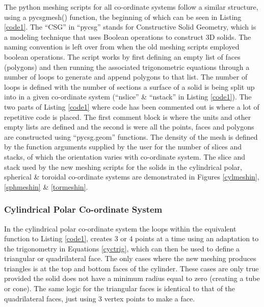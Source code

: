 \documentclass[12pt,a4paper]{article}
\begin{document}
\noindent The python meshing scripts for all co-ordinate systems follow a similar structure, using a pycsgmesh() function, the beginning of which can be seen in Listing \ref{code1}. The ``CSG'' in ``pycsg'' stands for Constructive Solid Geometry, which is a  modeling technique that uses Boolean operations to construct 3D solids. The naming convention is left over from when the old meshing scripts employed boolean operations. The script works by  first defining an empty list of faces (polygons) and then running the associated trigonometric equations through a number of loops to generate and append polygons to that list. The number of loops is defined with the number of sections a surface of a solid is being split up into in a given co-ordinate system (``nslice'' \& ``nstack'' in Listing \ref{code1}). The two parts of Listing \ref{code1} where code has been commented out is where a lot of repetitive code is placed. The first comment block is where the units and other empty lists are defined and the second is were all the points, faces and polygons are constructed using ``pycsg.geom'' functions. The density of the mesh is defined by the function arguments supplied by the user for the number of slices and stacks, of which the orientation varies with co-ordinate system. The slice and stack used by the new meshing scripts for the solids in the cylindrical polar, spherical \& toroidal co-ordinate systems are demonstrated in Figures \ref{cylmeshin}, \ref{sphmeshin} \& \ref{tormeshin}.

\subsubsection{Cylindrical Polar Co-ordinate System}
\label{cycl}
In the cylindrical polar co-ordinate system the loops within the equivalent function to Listing \ref{code1}, creates 3 or 4 points at a time using an adaptation to the trigonometry in Equations \ref{cyctrig}, which can then be used to define a triangular or quadrilateral face. The only cases where the new meshing produces triangles is at the top and bottom faces of the cylinder. These cases are only true provided the solid does not have a minimum radius equal to zero (creating a tube or cone). The same logic for the triangular faces is identical to that of the quadrilateral faces, just using 3 vertex points to make a face.
\end{document}
